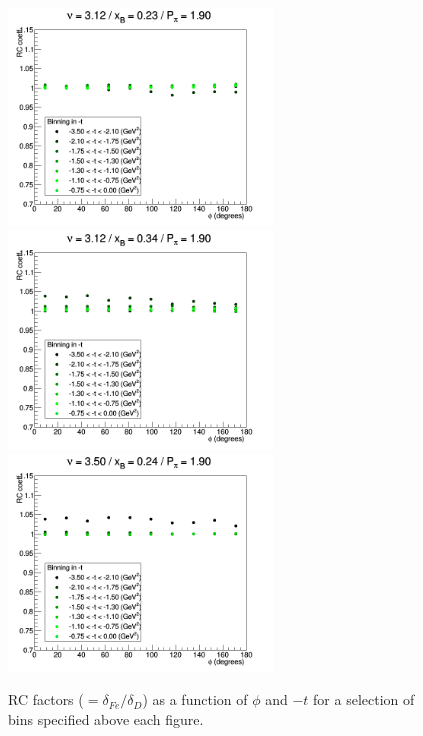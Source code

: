 \begin{figure}[tbp]
\includegraphics[width=7cm] {chap5-fig/ElecRadWei_Iron_10756.png}
\includegraphics[width=7cm] {chap5-fig/ElecRadWei_Iron_11556.png}
\includegraphics[width=7cm] {chap5-fig/ElecRadWei_Iron_18956.png}
\caption {RC factors ($= \delta_{Fe} / \delta_D$) as a function of $\phi$ and 
$-t$ for a selection of bins specified above each figure.}
\label{fig:IsoSpin}
\end{figure}

